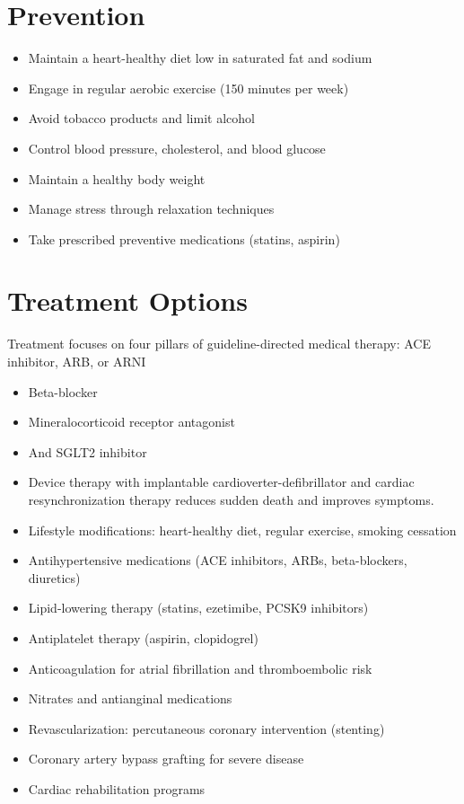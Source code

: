 \section{Prevention}
\begin{itemize}[noitemsep]
  \item Maintain a heart-healthy diet low in saturated fat and sodium
  \item Engage in regular aerobic exercise (150 minutes per week)
  \item Avoid tobacco products and limit alcohol
  \item Control blood pressure, cholesterol, and blood glucose
  \item Maintain a healthy body weight
  \item Manage stress through relaxation techniques
  \item Take prescribed preventive medications (statins, aspirin)
\end{itemize}
\section{Treatment Options}
Treatment focuses on four pillars of guideline-directed medical therapy: ACE inhibitor, ARB, or ARNI

\begin{itemize}[noitemsep]
  \item Beta-blocker
  \item Mineralocorticoid receptor antagonist
  \item And SGLT2 inhibitor
  \item Device therapy with implantable cardioverter-defibrillator and cardiac resynchronization therapy reduces sudden death and improves symptoms.
  \item Lifestyle modifications: heart-healthy diet, regular exercise, smoking cessation
  \item Antihypertensive medications (ACE inhibitors, ARBs, beta-blockers, diuretics)
  \item Lipid-lowering therapy (statins, ezetimibe, PCSK9 inhibitors)
  \item Antiplatelet therapy (aspirin, clopidogrel)
  \item Anticoagulation for atrial fibrillation and thromboembolic risk
  \item Nitrates and antianginal medications
  \item Revascularization: percutaneous coronary intervention (stenting)
  \item Coronary artery bypass grafting for severe disease
  \item Cardiac rehabilitation programs
\end{itemize}
